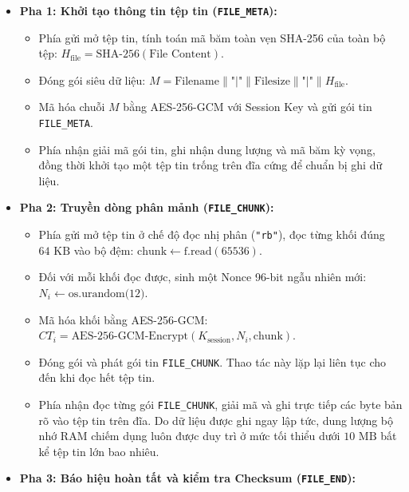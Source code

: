 \documentclass[a4paper,12pt]{article}
\begin{document}
\begin{itemize}
    \item \textbf{Pha 1: Khởi tạo thông tin tệp tin (\texttt{FILE\_META}):}
    \begin{itemize}
        \item Phía gửi mở tệp tin, tính toán mã băm toàn vẹn SHA-256 của toàn bộ tệp: $H_{\text{file}} = \text{SHA-256}(\text{File Content})$.
        \item Đóng gói siêu dữ liệu: $M = \text{Filename} \parallel \text{"|"} \parallel \text{Filesize} \parallel \text{"|"} \parallel H_{\text{file}}$.
        \item Mã hóa chuỗi $M$ bằng AES-256-GCM với Session Key và gửi gói tin \texttt{FILE\_META}.
        \item Phía nhận giải mã gói tin, ghi nhận dung lượng và mã băm kỳ vọng, đồng thời khởi tạo một tệp tin trống trên đĩa cứng để chuẩn bị ghi dữ liệu.
    \end{itemize}
    \item \textbf{Pha 2: Truyền dòng phân mảnh (\texttt{FILE\_CHUNK}):}
    \begin{itemize}
        \item Phía gửi mở tệp tin ở chế độ đọc nhị phân (\texttt{"rb"}), đọc từng khối đúng $64\text{ KB}$ vào bộ đệm: $\text{chunk} \leftarrow \text{f.read}(65536)$.
        \item Đối với mỗi khối đọc được, sinh một Nonce 96-bit ngẫu nhiên mới:\\
\hspace*{1em}$N_i \leftarrow \text{os.urandom(12)}$.
        \item Mã hóa khối bằng AES-256-GCM:\\
\hspace*{1em}$CT_i = \text{AES-256-GCM-Encrypt}(K_{\text{session}}, N_i, \text{chunk})$.
        \item Đóng gói và phát gói tin \texttt{FILE\_CHUNK}. Thao tác này lặp lại liên tục cho đến khi đọc hết tệp tin.
        \item Phía nhận đọc từng gói \texttt{FILE\_CHUNK}, giải mã và ghi trực tiếp các byte bản rõ vào tệp tin trên đĩa. Do dữ liệu được ghi ngay lập tức, dung lượng bộ nhớ RAM chiếm dụng luôn được duy trì ở mức tối thiểu dưới $10\text{ MB}$ bất kể tệp tin lớn bao nhiêu.
    \end{itemize}
    \item \textbf{Pha 3: Báo hiệu hoàn tất và kiểm tra Checksum (\texttt{FILE\_END}):}
    \begin{itemize}

\end{itemize}
\end{itemize}
\end{document}
